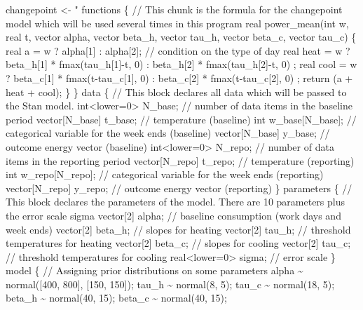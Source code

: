 \documentclass[
]{article}
\newenvironment{Shaded}{\begin{snugshade}}{\end{snugshade}}
\newcommand{\NormalTok}[1]{#1}
\newcommand{\OtherTok}[1]{\textcolor[rgb]{0.56,0.35,0.01}{#1}}
\newcommand{\StringTok}[1]{\textcolor[rgb]{0.31,0.60,0.02}{#1}}
\begin{document}
\begin{Shaded}
\begin{Highlighting}[]
\NormalTok{changepoint }\OtherTok{\textless{}{-}} \StringTok{"}
\StringTok{functions \{}
\StringTok{  // This chunk is the formula for the changepoint model which will be used several times in this program}
\StringTok{  real power\_mean(int w, real t, vector alpha, vector beta\_h, vector tau\_h, vector beta\_c, vector tau\_c) \{}
\StringTok{    real a = w ? alpha[1] : alpha[2];    // condition on the type of day}
\StringTok{    real heat = w ? beta\_h[1] * fmax(tau\_h[1]{-}t, 0) : beta\_h[2] * fmax(tau\_h[2]{-}t, 0) ;}
\StringTok{    real cool = w ? beta\_c[1] * fmax(t{-}tau\_c[1], 0) : beta\_c[2] * fmax(t{-}tau\_c[2], 0) ;}
\StringTok{    return (a + heat + cool);}
\StringTok{  \}}
\StringTok{\}}
\StringTok{data \{}
\StringTok{  // This block declares all data which will be passed to the Stan model.}
\StringTok{  int\textless{}lower=0\textgreater{} N\_base;        // number of data items in the baseline period}
\StringTok{  vector[N\_base] t\_base;      // temperature (baseline)}
\StringTok{  int w\_base[N\_base];      // categorical variable for the week ends (baseline)}
\StringTok{  vector[N\_base] y\_base;      // outcome energy vector (baseline)}
\StringTok{  }
\StringTok{  int\textless{}lower=0\textgreater{} N\_repo;        // number of data items in the reporting period}
\StringTok{  vector[N\_repo] t\_repo;      // temperature (reporting)}
\StringTok{  int w\_repo[N\_repo];      // categorical variable for the week ends (reporting)}
\StringTok{  vector[N\_repo] y\_repo;      // outcome energy vector (reporting)}
\StringTok{\}}
\StringTok{parameters \{}
\StringTok{  // This block declares the parameters of the model. There are 10 parameters plus the error scale sigma}
\StringTok{  vector[2] alpha;      // baseline consumption (work days and week ends)}
\StringTok{  vector[2] beta\_h;     // slopes for heating}
\StringTok{  vector[2] tau\_h;      // threshold temperatures for heating}
\StringTok{  vector[2] beta\_c;     // slopes for cooling}
\StringTok{  vector[2] tau\_c;      // threshold temperatures for cooling}
\StringTok{  real\textless{}lower=0\textgreater{} sigma;  // error scale}
\StringTok{\}}
\StringTok{model \{}
\StringTok{  // Assigning prior distributions on some parameters}
\StringTok{  alpha \textasciitilde{} normal([400, 800], [150, 150]);}
\StringTok{  tau\_h \textasciitilde{} normal(8, 5);}
\StringTok{  tau\_c \textasciitilde{} normal(18, 5);}
\StringTok{  beta\_h \textasciitilde{} normal(40, 15);}
\StringTok{  beta\_c \textasciitilde{} normal(40, 15);}

\end{Highlighting}
\end{Shaded}
\end{document}

